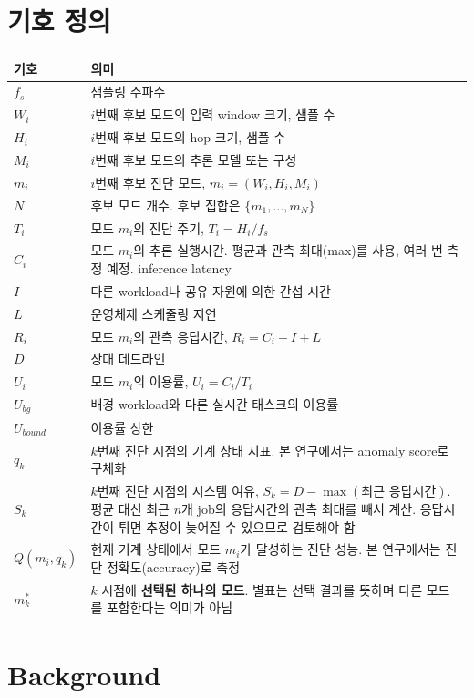 \documentclass[10pt]{article}
\begin{document}
\section{기호 정의}
\begin{center}\footnotesize
\begin{tabular}{@{}lL{13cm}@{}}
\toprule
기호 & 의미 \\ \midrule
$f_s$ & 샘플링 주파수 \\
$W_i$ & $i$번째 후보 모드의 입력 window 크기, 샘플 수 \\
$H_i$ & $i$번째 후보 모드의 hop 크기, 샘플 수 \\
$M_i$ & $i$번째 후보 모드의 추론 모델 또는 구성 \\
$m_i$ & $i$번째 후보 진단 모드, $m_i = (W_i, H_i, M_i)$ \\
$N$ & 후보 모드 개수. 후보 집합은 $\{m_1, \dots, m_N\}$ \\
$T_i$ & 모드 $m_i$의 진단 주기, $T_i = H_i / f_s$ \\
$C_i$ & 모드 $m_i$의 추론 실행시간. 평균과 관측 최대(max)를 사용, 여러 번 측정 예정. inference latency \\
$I$ & 다른 workload나 공유 자원에 의한 간섭 시간 \\
$L$ & 운영체제 스케줄링 지연 \\
$R_i$ & 모드 $m_i$의 관측 응답시간, $R_i = C_i + I + L$ \\
$D$ & 상대 데드라인 \\
$U_i$ & 모드 $m_i$의 이용률, $U_i = C_i / T_i$ \\
$U_{bg}$ & 배경 workload와 다른 실시간 태스크의 이용률 \\
$U_{bound}$ & 이용률 상한 \\
$q_k$ & $k$번째 진단 시점의 기계 상태 지표. 본 연구에서는 anomaly score로 구체화 \\
$S_k$ & $k$번째 진단 시점의 시스템 여유, $S_k = D - \max(\text{최근 응답시간})$. 평균 대신 최근 $n$개 job의 응답시간의 관측 최대를 빼서 계산. 응답시간이 튀면 추정이 늦어질 수 있으므로 검토해야 함 \\
$Q(m_i, q_k)$ & 현재 기계 상태에서 모드 $m_i$가 달성하는 진단 성능. 본 연구에서는 진단 정확도(accuracy)로 측정 \\
$m^{*}_k$ & $k$ 시점에 \textbf{선택된 하나의 모드}. 별표는 선택 결과를 뜻하며 다른 모드를 포함한다는 의미가 아님 \\
\bottomrule
\end{tabular}
\end{center}

\section{Background}
\end{document}
